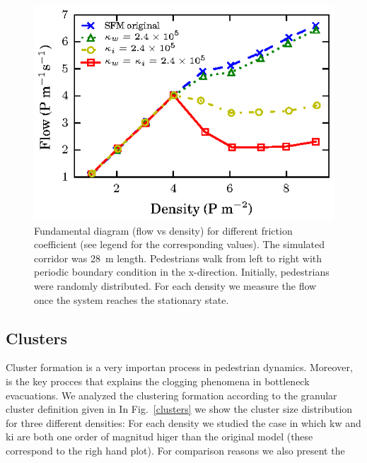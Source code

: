 \begin{figure}[htbp!]
\includegraphics[width=\columnwidth]
{plots/flow-density_pasillo22m_fgmodified_multi.eps}
\caption{\label{fgmodified-w22} Fundamental diagram (flow vs density) for different friction coefficient (see legend for the corresponding values). The simulated corridor was 28~m length. Pedestrians walk from left to right with periodic boundary condition in the x-direction. Initially, pedestrians were randomly distributed. For each density we measure the flow once the system reaches the stationary state.}
\end{figure}


\subsection{\label{clusters}Clusters}

Cluster formation is a very importan process in pedestrian dynamics. Moreover, is the key procces that explains the clogging phenomena in bottleneck evacuations. We analyzed the clustering formation according to the granular cluster definition given in
In Fig.~\ref{clusters} we show the cluster size distribution for three different densities: 
For each density we studied the case in which kw and ki are both one order of magnitud higer than the original model (these correspond to the righ hand plot). For comparison reasons we also present the  


